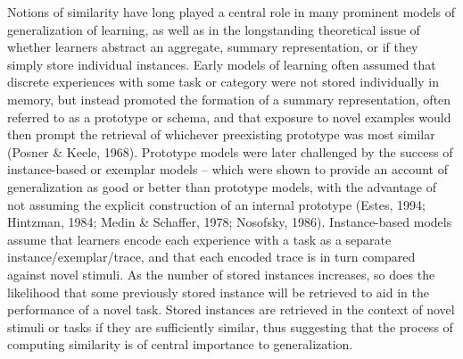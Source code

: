 \documentclass[
  jou, donotrepeattitle,floatsintext]{apa7}
\begin{document}
Notions of similarity have long played a central role in many prominent models of generalization of learning, as well as in the longstanding theoretical issue of whether learners abstract an aggregate, summary representation, or if they simply store individual instances. Early models of learning often assumed that discrete experiences with some task or category were not stored individually in memory, but instead promoted the formation of a summary representation, often referred to as a prototype or schema, and that exposure to novel examples would then prompt the retrieval of whichever preexisting prototype was most similar (Posner \& Keele, 1968). Prototype models were later challenged by the success of instance-based or exemplar models -- which were shown to provide an account of generalization as good or better than prototype models, with the advantage of not assuming the explicit construction of an internal prototype (Estes, 1994; Hintzman, 1984; Medin \& Schaffer, 1978; Nosofsky, 1986). Instance-based models assume that learners encode each experience with a task as a separate instance/exemplar/trace, and that each encoded trace is in turn compared against novel stimuli. As the number of stored instances increases, so does the likelihood that some previously stored instance will be retrieved to aid in the performance of a novel task. Stored instances are retrieved in the context of novel stimuli or tasks if they are sufficiently similar, thus suggesting that the process of computing similarity is of central importance to generalization.
\end{document}
